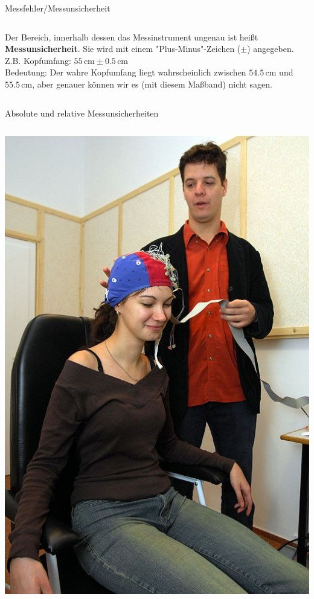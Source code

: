 \documentclass{beamer}
\begin{document}
\begin{frame}{Messfehler/Messunsicherheit}
\begin{columns}[c]
\begin{column}{7cm}
\pause
Der Bereich, innerhalb dessen das Messinstrument ungenau ist heißt \textbf{Messunsicherheit}. Sie wird mit einem "Plus-Minus"-Zeichen (\(\pm\)) angegeben. \\

\pause
Z.B. Kopfumfang: \(55\,\text{cm} \pm 0.5\,\text{cm}\) \\
\pause
Bedeutung: Der wahre Kopfumfang liegt wahrscheinlich zwischen \(54.5\,\text{cm}\) und \(55.5\,\text{cm}\), aber genauer können wir es (mit diesem Maßband) nicht sagen. 

    \end{column}


\end{columns}


\end{frame}

\begin{frame}{Absolute und relative Messunsicherheiten}

\begin{columns}[c]
    \begin{column}{3cm}
        \includegraphics[width=\textwidth]{eeg_probandin_und_experimentator.png}
    \end{column}


\end{columns}
\end{frame}
\end{document}
